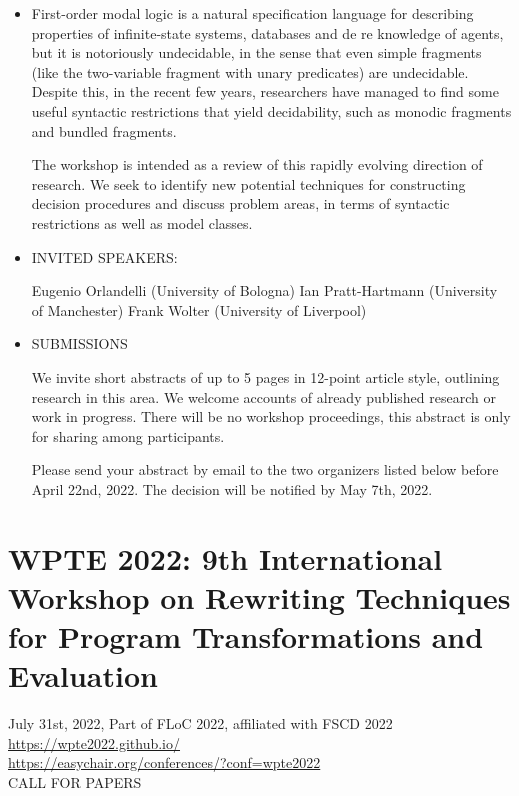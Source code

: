 \documentclass[prodmode,acmtecs]{acmsmall} %
\begin{document}
\begin{itemize}\item  First-order modal logic is a natural specification language for describing properties of infinite-state systems, databases and de re knowledge of agents, but it is notoriously undecidable, in the sense that even simple fragments (like the two-variable fragment with unary predicates) are undecidable. Despite this, in the recent few years, researchers have managed to find some useful syntactic restrictions that yield decidability, such as monodic fragments and bundled fragments. 
 
  The workshop is intended as a review of this rapidly evolving direction of research. We seek to identify new potential techniques for constructing decision procedures and discuss problem areas, in terms of syntactic restrictions as well as model classes. 
 
\item  INVITED SPEAKERS: 
 
  Eugenio Orlandelli (University of Bologna) Ian Pratt-Hartmann (University of Manchester) Frank Wolter (University of Liverpool) 
 
\item  SUBMISSIONS 
 
  We invite short abstracts of up to 5 pages in 12-point article style, outlining research in this area. We welcome accounts of already published research or work in progress. There will be no workshop proceedings, this abstract is only for sharing among participants.  
 
  Please send your abstract by email to the two organizers listed below before April 22nd, 2022. The decision will be notified by May 7th, 2022. 
 
\end{itemize}\section{WPTE 2022: 9th International Workshop on Rewriting Techniques for Program Transformations and Evaluation}\label{WPTE2022}  July 31st, 2022, Part of FLoC 2022, affiliated with FSCD 2022\\ 
  \href{https://wpte2022.github.io/}{https://wpte2022.github.io/}\\ 
  \href{https://easychair.org/conferences/?conf=wpte2022}{https://easychair.org/conferences/?conf=wpte2022}\\ 
CALL FOR PAPERS 
\end{document}
